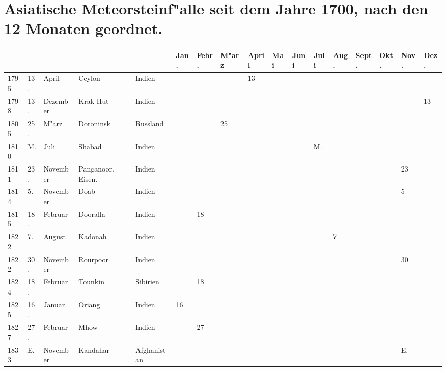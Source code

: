 \documentclass[a4paper, 8pt, oneside, polutonikogreek, german]{article}
\begin{document}
\section{Asiatische Meteorsteinf"alle seit dem Jahre 1700, nach den 12 Monaten geordnet.}
\vspace*{\fill}
\clearpage
\begin{landscape}
\begin{table}[H]
    \centering
    \footnotesize
    \begin{longtable}{|l|l|l|l|l|l|l|l|l|l|l|l|l|l|l|l|l|}
    \hline
         & & & & & Jan. & Febr. & M"arz & April & Mai & Juni & Juli & Aug. & Sept. & Okt. & Nov. & Dez. \\ \hline
        1795 & 13. & April & Ceylon & Indien & ~ & ~ & ~ & 13 & ~ & ~ & ~ & ~ & ~ & ~ & ~ & ~ \\ \hline
        1798 & 13. & Dezember & Krak-Hut & Indien & ~ & ~ & ~ & ~ & ~ & ~ & ~ & ~ & ~ & ~ & ~ & 13 \\ \hline
        1805 & 25. & M"arz & Doroninsk & Russland & ~ & ~ & 25 & ~ & ~ & ~ & ~ & ~ & ~ & ~ & ~ & ~ \\ \hline
        1810 & M. & Juli & Shabad & Indien & ~ & ~ & ~ & ~ & ~ & ~ & M. & ~ & ~ & ~ & ~ & ~ \\ \hline
        1811 & 23. & November & Panganoor. Eisen. & Indien & ~ & ~ & ~ & ~ & ~ & ~ & ~ & ~ & ~ & ~ & 23 & ~ \\ \hline
        1814 & 5. & November & Doab & Indien & ~ & ~ & ~ & ~ & ~ & ~ & ~ & ~ & ~ & ~ & 5 & ~ \\ \hline
        1815 & 18. & Februar & Dooralla & Indien & ~ & 18 & ~ & ~ & ~ & ~ & ~ & ~ & ~ & ~ & ~ & ~ \\ \hline
        1822 & 7. & August & Kadonah & Indien & ~ & ~ & ~ & ~ & ~ & ~ & ~ & 7 & ~ & ~ & ~ & ~ \\ \hline
        1822 & 30. & November & Rourpoor & Indien & ~ & ~ & ~ & ~ & ~ & ~ & ~ & ~ & ~ & ~ & 30 & ~ \\ \hline
        1824 & 18. & Februar & Tounkin & Sibirien & ~ & 18 & ~ & ~ & ~ & ~ & ~ & ~ & ~ & ~ & ~ & ~ \\ \hline
        1825 & 16. & Januar & Oriang & Indien & 16 & ~ & ~ & ~ & ~ & ~ & ~ & ~ & ~ & ~ & ~ & ~ \\ \hline
        1827 & 27. & Februar & Mhow & Indien & ~ & 27 & ~ & ~ & ~ & ~ & ~ & ~ & ~ & ~ & ~ & ~ \\ \hline
        1833 & E. & November & Kandahar & Afghanistan & ~ & ~ & ~ & ~ & ~ & ~ & ~ & ~ & ~ & ~ & E. & ~ \\ \hline

\end{longtable}
\end{table}
\end{landscape}
\end{document}
